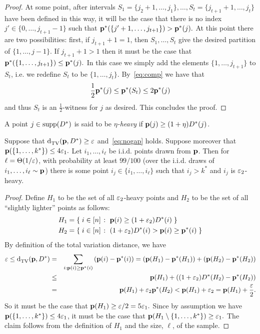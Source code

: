 \begin{proof}
At some point, after intervals $S_1 = \{j_2+1,\dots,j_1\},\dots,S_t
= \{j_{t+1}+1,\dots,j_t\}$ have been defined in this way, it will be the
case that there is no index $j' \in \{0,\dots,j_{t+1}-1\}$ such that
\mbox{$\mathbf{p}^\ast(\{j' + 1,\dots,j_{t+1}\}) > \mathbf{p}^\ast(j).$}
At this point there are two possibilities:  first, if $j_{t+1}+1=1$,
then $S_1,\dots,S_t$ give the desired partition of $\{1,\dots,j-1\}$.
If $j_{t+1}+1>1$ then it must be the case that
$\mathbf{p}^\ast(\{1,\dots,j_{t+1}\}) \leq \mathbf{p}^\ast(j).$
In this case we simply add the elements $\{1,\dots,j_{t+1}\}$
to $S_{t}$, i.e. we redefine $S_t$ to be
$\{1,\dots,j_t\}$.  By~\cref{eq:comp} we have that
\[
\frac{1}{2}\mathbf{p}^\ast(j) \leq \mathbf{p}^\ast(S_t) \leq 2\mathbf{p}^\ast(j)
\]
and thus $S_t$ is an ${\frac{1}2}$-\good witness for $j$ as desired. This
concludes the proof.
\end{proof}

\begin{definition}
A point $j\in\operatorname{supp}\!\left(D^\ast\right)$ is said to be \emph{$\eta$-heavy}
if \mbox{$\mathbf{p}(j) \geq (1+\eta)D^\ast(j)$}.
\end{definition}

\begin{claim}\label{claim:finding:heavy:guy}

Suppose that ${\operatorname{d}_{\textrm{TV}}^{}\!\left({\mathbf{p}, D^\ast}\right)} \geq \varepsilon$ and~\cref{eq:nogap} holds.
Suppose moreover that $\mathbf{p}(\{1,\dots,k^\ast\}) \leq 4 {\varepsilon_1}.$
Let $i_1,\dots,i_\ell$ be i.i.d. points drawn from $\mathbf{p}$.
Then for $\ell = \Theta(1/\varepsilon)$, with probability at least $99/100$
(over the i.i.d. draws of $i_1,\dots,i_\ell \sim \mathbf{p}$)
there is some point $i_j \in \{i_1,\dots,i_\ell\}$ such that
$i_j > k^\ast$ and $i_j$ is ${\varepsilon_2}$-heavy.
\end{claim}
\begin{proof}
Define $H_1$ to be the set of all ${\varepsilon_2}$-heavy points and $H_2$ to be the
set of all ``slightly lighter'' points as follows:
\begin{align*}
H_1 &= \left\{\;  i\in [n]  \;\colon\;  \mathbf{p}(i) \geq (1+{\varepsilon_2})D^\ast(i) \; \right\} \\
H_2 &= \left\{\;  i\in [n]  \;\colon\;  (1+{\varepsilon_2})D^\ast(i) > \mathbf{p}(i) \geq \mathbf{p}^\ast(i)  \; \right\}
\end{align*}
By definition of the total variation distance, we have
\begin{eqnarray*}
\varepsilon \leq {\operatorname{d}_{\textrm{TV}}^{}\!\left({\ensuremath{\mathbf{p}}, D^\ast}\right)}
&=& \sum_{i : \mathbf{p}(i) \geq \mathbf{p}^\ast(i)} \left( \mathbf{p}(i) - \mathbf{p}^\ast(i) \right) =  \left( \mathbf{p}(H_1)-\mathbf{p}^\ast(H_1) \right)
+ \left( \mathbf{p}(H_2)-\mathbf{p}^\ast(H_2) \right) \\
&\leq& \mathbf{p}(H_1) + \left( (1+{\varepsilon_2})D^\ast (H_2)-\mathbf{p}^\ast(H_2) \right) \\
&=& \mathbf{p}(H_1) + {\varepsilon_2} \mathbf{p}^\ast(H_2)
< \mathbf{p}(H_1) + {\varepsilon_2} = \mathbf{p}(H_1) + {\frac{\varepsilon}2}.
\end{eqnarray*}
So it must be the case that $\mathbf{p}(H_1) \geq \varepsilon/2 = 5 {\varepsilon_1}.$  Since by assumption we have $\mathbf{p}(\{1,\dots,k^\ast\}) \leq 4 {\varepsilon_1}$, it must be the case that $\D(H_1 \setminus \{1,\dots,k^\ast\}) \geq  {\eps_1}.$ The claim follows from the definition of $H_1$ and the size, $\ell$, of the sample.
\end{proof}


